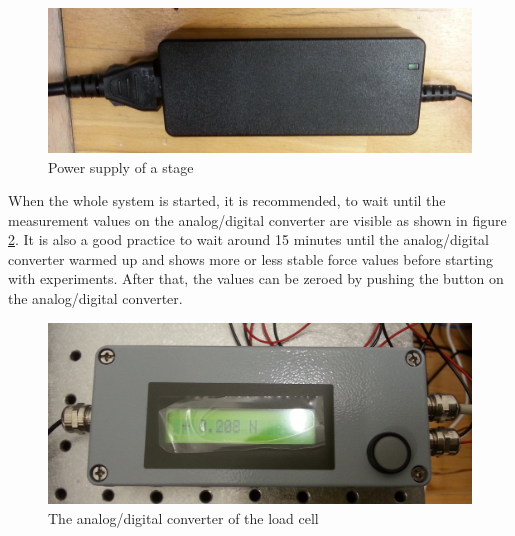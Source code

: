 \begin{figure}[!ht]
	\centering
		\includegraphics[width=1.0\textwidth]{images/PowerSupply}
	\caption{Power supply of a stage}
	\label{fig:powersupply}
\end{figure}

When the whole system is started, it is recommended, to wait until the measurement values on the analog/digital converter are visible as shown in figure \ref{fig:analogdigitalconverter}. It is also a good practice to wait around 15 minutes until the analog/digital converter warmed up and shows more or less stable force values before starting with experiments. After that, the values can be zeroed by pushing the button on the analog/digital converter.

\begin{figure}[!ht]
	\centering
		\includegraphics[width=1.0\textwidth]{images/AnalogDigitalConverter}
	\caption{The analog/digital converter of the load cell}
	\label{fig:analogdigitalconverter}
\end{figure}
